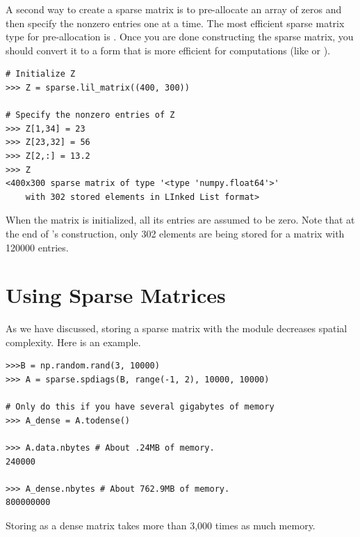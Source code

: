 A second way to create a sparse matrix is to pre-allocate an array of zeros and then specify the nonzero entries one at a time. The most efficient sparse matrix type for pre-allocation is . Once you are done constructing the sparse matrix, you should convert it to a form that is more efficient for computations (like  or ).


\begin{lstlisting}
# Initialize Z
>>> Z = sparse.lil_matrix((400, 300))

# Specify the nonzero entries of Z
>>> Z[1,34] = 23
>>> Z[23,32] = 56
>>> Z[2,:] = 13.2
>>> Z
<400x300 sparse matrix of type '<type 'numpy.float64'>'
	with 302 stored elements in LInked List format>

\end{lstlisting}

When the matrix  is initialized, all its entries are assumed to be zero. 
Note that at the end of 's construction, only 302 elements are being stored for a matrix with 120000 entries. 

\section*{Using Sparse Matrices}
As we have discussed, storing a sparse matrix with the  module decreases spatial complexity. Here is an example.

\begin{lstlisting}
>>>B = np.random.rand(3, 10000)
>>> A = sparse.spdiags(B, range(-1, 2), 10000, 10000)

# Only do this if you have several gigabytes of memory
>>> A_dense = A.todense() 

>>> A.data.nbytes # About .24MB of memory.
240000

>>> A_dense.nbytes # About 762.9MB of memory.
800000000

\end{lstlisting}
Storing  as a dense matrix takes more than 3,000 times as much memory. 

